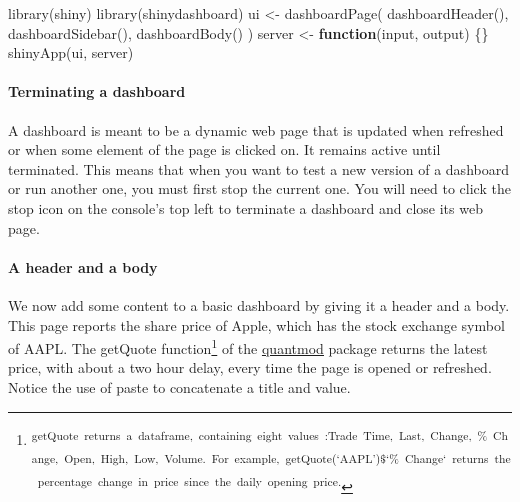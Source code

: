 \documentclass[
]{article}
\newenvironment{Shaded}{\begin{snugshade}}{\end{snugshade}}
\newcommand{\ControlFlowTok}[1]{\textcolor[rgb]{0.13,0.29,0.53}{\textbf{#1}}}
\newcommand{\FunctionTok}[1]{\textcolor[rgb]{0.00,0.00,0.00}{#1}}
\newcommand{\NormalTok}[1]{#1}
\newcommand{\OtherTok}[1]{\textcolor[rgb]{0.56,0.35,0.01}{#1}}
\begin{document}
\begin{Shaded}
\begin{Highlighting}[]
\FunctionTok{library}\NormalTok{(shiny)}
\FunctionTok{library}\NormalTok{(shinydashboard)}
\NormalTok{ui }\OtherTok{\textless{}{-}} \FunctionTok{dashboardPage}\NormalTok{(}
  \FunctionTok{dashboardHeader}\NormalTok{(),}
  \FunctionTok{dashboardSidebar}\NormalTok{(),}
  \FunctionTok{dashboardBody}\NormalTok{()}
\NormalTok{)}
\NormalTok{server }\OtherTok{\textless{}{-}} \ControlFlowTok{function}\NormalTok{(input, output) \{\}}
\FunctionTok{shinyApp}\NormalTok{(ui, server)}
\end{Highlighting}
\end{Shaded}

\hypertarget{terminating-a-dashboard}{%
\paragraph*{Terminating a dashboard}\label{terminating-a-dashboard}}

A dashboard is meant to be a dynamic web page that is updated when
refreshed or when some element of the page is clicked on. It remains
active until terminated. This means that when you want to test a new
version of a dashboard or run another one, you must first stop the
current one. You will need to click the stop icon on the console's top
left to terminate a dashboard and close its web page.

\hypertarget{a-header-and-a-body}{%
\paragraph*{A header and a body}\label{a-header-and-a-body}}

We now add some content to a basic dashboard by giving it a header and a
body. This page reports the share price of Apple, which has the stock
exchange symbol of AAPL. The getQuote function\footnote{\textsuperscript{getQuote~returns~a~dataframe,~containing~eight~values~:Trade~Time,~Last,~Change,~\%~Change,~Open,~High,~Low,~Volume.~For~example,~getQuote(`AAPL')\$`\%~Change`~returns~the~percentage~change~in~price~since~the~daily~opening~price.}} of the
\href{https://cran.r-project.org/web/packages/quantmod/index.html}{\underline{quantmod}}
package returns the latest price, with about a two hour delay, every
time the page is opened or refreshed. Notice the use of paste to
concatenate a title and value.
\end{document}
